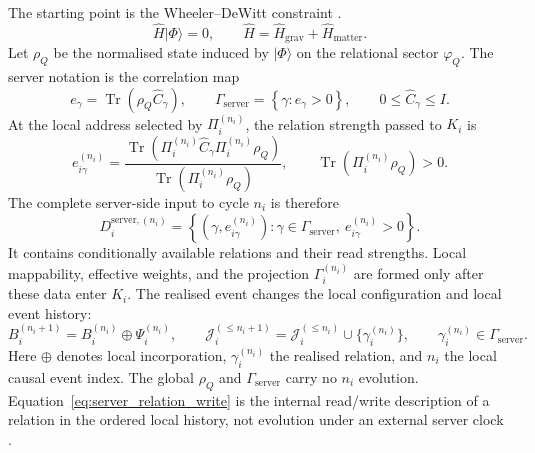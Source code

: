 The starting point is the Wheeler--DeWitt constraint \citep{dewitt1967}.
\begin{equation}
  \hat H|\Phi\rangle=0,
  \qquad
  \hat H=\hat H_{\mathrm{grav}}+\hat H_{\mathrm{matter}}.
  \label{eq:wdw}
\end{equation}
Let $\rho_Q$ be the normalised state induced by $|\Phi\rangle$ on the relational
sector $\varphi_Q$. The server notation is the correlation map
\begin{equation}
  e_\gamma=\operatorname{Tr}(\rho_Q\hat C_\gamma),
  \qquad
  \Gamma_{\mathrm{server}}
  =\left\{\gamma:e_\gamma>0\right\},
  \qquad 0\leq\hat C_\gamma\leq I.
  \label{eq:server_relation_encoding}
\end{equation}
At the local address selected by $\Pi_i^{(n_i)}$, the relation strength passed to
$K_i$ is
\begin{equation}
  e_{i\gamma}^{(n_i)}=
  \frac{\operatorname{Tr}\!\left(
    \Pi_i^{(n_i)}\hat C_\gamma\Pi_i^{(n_i)}\rho_Q
  \right)}
  {\operatorname{Tr}\!\left(\Pi_i^{(n_i)}\rho_Q\right)},
  \qquad \operatorname{Tr}\!\left(\Pi_i^{(n_i)}\rho_Q\right)>0.
  \label{eq:server_relation_read}
\end{equation}
The complete server-side input to cycle $n_i$ is therefore
\begin{equation}
  D_i^{\mathrm{server},(n_i)}=
  \left\{(\gamma,e_{i\gamma}^{(n_i)}):
  \gamma\in\Gamma_{\mathrm{server}},\ e_{i\gamma}^{(n_i)}>0\right\}.
  \label{eq:available_server_data}
\end{equation}
It contains conditionally available relations and their read strengths. Local
mappability, effective weights, and the projection $\Gamma_i^{(n_i)}$ are formed
only after these data enter $K_i$.
The realised event changes the local configuration and local event history:
\begin{equation}
  B_i^{(n_i+1)}=B_i^{(n_i)}\oplus\Psi_i^{(n_i)},
  \qquad
  \mathcal J_i^{(\leq n_i+1)}
  =\mathcal J_i^{(\leq n_i)}\cup\{\gamma_i^{(n_i)}\},
  \qquad \gamma_i^{(n_i)}\in\Gamma_{\mathrm{server}}.
  \label{eq:server_relation_write}
\end{equation}
\noindent Here $\oplus$ denotes local incorporation, $\gamma_i^{(n_i)}$ the realised
relation, and $n_i$ the local causal event index. The global $\rho_Q$ and
$\Gamma_{\mathrm{server}}$ carry no $n_i$ evolution. Equation~\eqref{eq:server_relation_write}
is the internal read/write description of a relation in the ordered local history,
not evolution under an external server clock \citep{pagewootters1983}.

